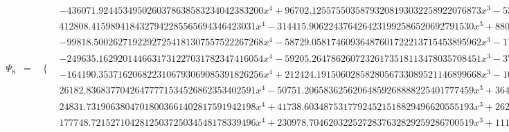 \documentclass{article}
\begin{document}
\begin{landscape}
\begin{eqnarray*}
\begin{array}{cc}
\end{array}\\
\Psi_8 & = & \begin{array}{cc}
 \{ & 
\begin{array}{cc}
 -436071.9244534950260378638583234042383200 x^4+96702.12557550358793208193032258922076873 x^3-5389.451565604171866962951435086692500055 x^2-7.794168283286385468693217731051738244725 x+2.789012359635244408139072747630604760937 & x\geq 0\land x<\frac{1}{8} \\
 412808.4159894184327942285565694346423031 x^4-314415.9062243764264231992586520692791530 x^3+88085.72351115769527946337814924388224743 x^2-10737.30785656463889629719187197688199615 x+479.1473418135951184762697647596270468901 & x\geq \frac{1}{8}\land x<\frac{1}{4} \\
 -99818.50026271922927254181307557522267268 x^4-58729.05817460936487601722213715453895962 x^3-11309.79037068224513838130717402697158535 x^2-747.8050656611079749441830139683127345855 x-7.350380589071378284247727478097561408521 & x\geq -\frac{1}{4}\land x<-\frac{1}{8} \\
 -249635.1629201446631731227031782347416054 x^4-59205.26478626072326173518113478035708451 x^3-3757.264812811043668408312485424658531752 x^2-7.794168283286385468693217731051738244725 x+2.789012359635244408139072747630604760937 & x\geq -\frac{1}{8}\land x<0 \\
 -164190.3537162068223106793069085391826256 x^4+212424.1915060285828056733089521146899668 x^3-102453.1944465244355834558841856821860843 x^2+21812.05590442706574880557433707502201783 x-1727.486308954177480314555418675008949737 & x\geq \frac{1}{4}\land x<\frac{3}{8} \\
 26182.83683770426477771534526862353402591 x^4-50751.20658362562064859268888225401777459 x^3+36419.18751230419176283272820592771020601 x^2-11471.95437808715761135066406387836216523 x+1338.774759931337075764358192694756349408 & x\geq \frac{3}{8}\land x<\frac{1}{2} \\
 24831.73190638047018003661402817591942198 x^4+41738.60348753177924521518829496620555193 x^3+26255.88504210478778448492773940683812572 x^2+7332.697368839090981746842021052086043202 x+767.4957841634178107005938424768962447794 & x\geq -\frac{1}{2}\land x<-\frac{3}{8} \\
 177748.7215271042812503725034548178339496 x^4+230978.7046203225272837632829259286700519 x^3+111495.1701500336880388005007474987632946 x^2+23682.42103251109824137002103061601905464 x+1867.332944963547079236876631236454219273 & x\geq -\frac{3}{8}\land x<-\frac{1}{4} \\

\end{array}
\end{array}
\end{eqnarray*}
\end{landscape}
\end{document}
